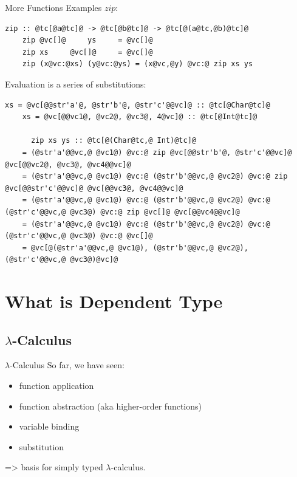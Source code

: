 \documentclass[xcolor={usenames,dvipsnames}]{beamer}
\begin{document}
\begin{frame}[fragile]{More Functions Examples}
  $zip$:
  \begin{lstlisting}[style=hask]
    zip :: @tc[@a@tc]@ -> @tc[@b@tc]@ -> @tc[@(a@tc,@b)@tc]@
    zip @vc[]@     ys     = @vc[]@
    zip xs     @vc[]@     = @vc[]@
    zip (x@vc:@xs) (y@vc:@ys) = (x@vc,@y) @vc:@ zip xs ys
  \end{lstlisting}

  Evaluation is a series of substitutions:
  \begin{lstlisting}[style=hask]
    xs = @vc[@@str'a'@, @str'b'@, @str'c'@@vc]@ :: @tc[@Char@tc]@
    xs = @vc[@@vc1@, @vc2@, @vc3@, 4@vc]@ :: @tc[@Int@tc]@

      zip xs ys :: @tc[@(Char@tc,@ Int)@tc]@
    = (@str'a'@@vc,@ @vc1@) @vc:@ zip @vc[@@str'b'@, @str'c'@@vc]@ @vc[@@vc2@, @vc3@, @vc4@@vc]@
    = (@str'a'@@vc,@ @vc1@) @vc:@ (@str'b'@@vc,@ @vc2@) @vc:@ zip @vc[@@str'c'@@vc]@ @vc[@@vc3@, @vc4@@vc]@
    = (@str'a'@@vc,@ @vc1@) @vc:@ (@str'b'@@vc,@ @vc2@) @vc:@ (@str'c'@@vc,@ @vc3@) @vc:@ zip @vc[]@ @vc[@@vc4@@vc]@
    = (@str'a'@@vc,@ @vc1@) @vc:@ (@str'b'@@vc,@ @vc2@) @vc:@ (@str'c'@@vc,@ @vc3@) @vc:@ @vc[]@
    = @vc[@(@str'a'@@vc,@ @vc1@), (@str'b'@@vc,@ @vc2@), (@str'c'@@vc,@ @vc3@)@vc]@
  \end{lstlisting}
\end{frame}
\section{What is Dependent Type}

\subsection{$\lambda$-Calculus}

\begin{frame}[fragile]{$\lambda$-Calculus}
  So far, we have seen:
  \pause
  \begin{itemize}
    \item function application
    \item function abstraction {\tiny(aka higher-order functions)}
    \pause
    \item variable binding
    \pause
    \item substitution
  \end{itemize}
  \pause
  => basis for simply typed $\lambda$-calculus.
\end{frame}
\end{document}
